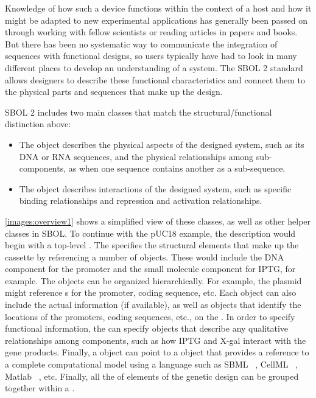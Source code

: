 Knowledge of how such a device functions within the context of a host and how it might be adapted to new experimental applications has generally been passed on through working with fellow scientists or reading articles in papers and books. 
But there has been no systematic way to communicate the integration of sequences with functional designs, so users typically have had to look in many different places to develop an understanding of a system.  
The SBOL 2 standard allows designers to describe these functional characteristics and connect them to the physical parts and sequences that make up the design. 

SBOL 2 includes two main classes that match the structural/functional distinction above:
\begin{itemize}
\item The  object describes the physical aspects of the designed system, such as its DNA or RNA sequences, and the physical relationships among sub-components, as when one sequence contains another as a sub-sequence.
\item The  object describes interactions of the designed system, such as specific binding relationships and repression and activation relationships. 
\end{itemize}

\ref{images:overview1} shows a simplified view of these classes, as well as other helper classes in SBOL. To continue with the pUC18 example, the description would begin with a top-level .  
The  specifies the structural elements that make up the cassette by referencing a number of  objects. These would include the DNA component for the promoter and the small molecule component for IPTG, for example.  
The  objects can be organized hierarchically.  
For example, the plasmid  might reference s for the promoter, coding sequence, etc.  
Each  object can also include the actual  information (if available), as well as  objects that identify the locations of the promoters, coding sequences, etc., on the .  
In order to specify functional information, the  can specify  objects that describe any qualitative relationships among components, such as how IPTG and X-gal interact with the gene products.  Finally, a  object can point to a  object that provides a reference to a complete computational model using a language such as SBML  ~\cite{SBML}, CellML ~\cite{CellML}, Matlab ~\cite{matlab}, etc.  Finally, all the of elements of the genetic design can be grouped together within a .

